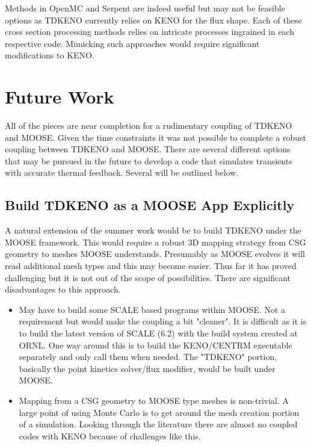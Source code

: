 \documentclass[11pt]{article}
\begin{document}
Methods in OpenMC and Serpent are indeed  useful but may not be feasible options as TDKENO  currently relies  on KENO for the flux shape.  Each of these cross section processing methods relies on intricate processes ingrained in each respective code.  Mimicking such approaches would require significant modifications to KENO.  



\section{Future Work}
All of the pieces are near  completion for a rudimentary coupling of TDKENO and MOOSE.  Given the time constraints it was not possible to complete a robust coupling between TDKENO and MOOSE.  There are several different options that may be pursued in the future to develop a code that simulates transients with accurate thermal feedback. Several will be outlined below. 

\subsection{Build TDKENO as a MOOSE App Explicitly}  
A natural extension of the summer work would be to build TDKENO under the MOOSE framework.  This would require a robust 3D mapping strategy from CSG geometry to meshes MOOSE understands.  Presumably as MOOSE evolves it will read additional mesh types and this may become easier.  Thus far it has proved challenging but it is not out of the scope of possibilities.   
There are significant disadvantages to this approach.

\begin{itemize}
    \item May have to build some SCALE based programs within MOOSE. Not a requirement but would make the coupling a bit "cleaner".  It is difficult as it is to build the latest version of SCALE (6.2) with the build system created at ORNL. One way around this is to build the KENO/CENTRM executable separately and only call them when needed.  The "TDKENO" portion, basically the point kinetics solver/flux modifier, would be built under MOOSE.
    \item Mapping from a CSG geometry to MOOSE type meshes is non-trivial.  A large point of using Monte Carlo is to get around the mesh creation portion of a simulation. Looking through the literature there are almost no coupled codes with KENO because of challenges like this.   
\end{itemize}
\end{document}
